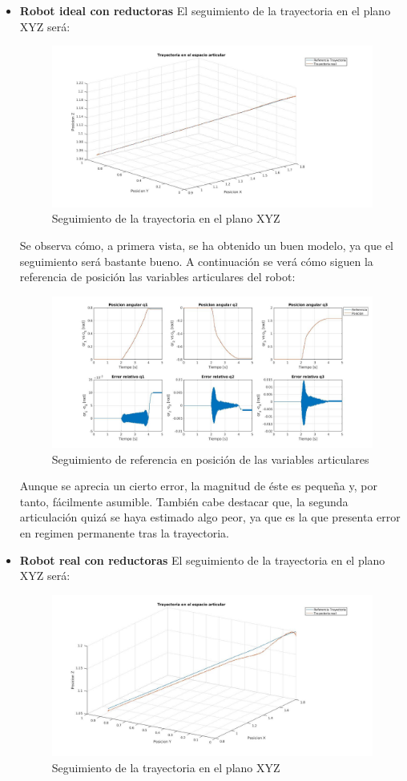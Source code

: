\begin{itemize}
	\item \textbf{Robot ideal con reductoras}
	El seguimiento de la trayectoria en el plano XYZ será:
	\begin{figure}[h!]
		\centering
		\includegraphics[width=.8\textwidth]{exp3_trayPDideal}
		\caption{Seguimiento de la trayectoria en el plano XYZ}
	\end{figure}

	Se observa cómo, a primera vista, se ha obtenido un buen modelo, ya que el seguimiento será bastante bueno. A continuación se verá cómo siguen la referencia de posición las variables articulares del robot:

	\begin{figure}[h!]
		\centering
		\includegraphics[width=.7\textwidth]{exp3_posPDidealCR}
		\caption{Seguimiento de referencia en posición de las variables articulares}
	\end{figure}

\newpage
	Aunque se aprecia un cierto error, la magnitud de éste es pequeña y, por tanto, fácilmente asumible. También cabe destacar que, la segunda articulación quizá se haya estimado algo peor, ya que es la que presenta error en regimen permanente tras la trayectoria. \\

	\item \textbf{Robot real con reductoras}
	El seguimiento de la trayectoria en el plano XYZ será:

	\begin{figure}[h!]
		\centering
		\includegraphics[width=.8\textwidth]{exp3_trayPDreal}
		\caption{Seguimiento de la trayectoria en el plano XYZ}
	\end{figure}


\end{itemize}
